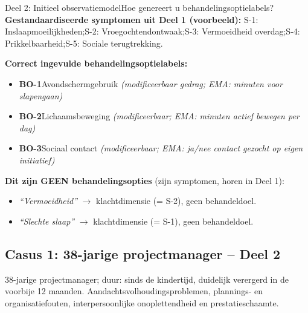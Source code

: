 \documentclass[11pt,a4paper]{article}
\begin{document}
\begin{voorbeeldbox}{Deel 2: Initieel observatiemodel}{Hoe genereert u behandelingsoptielabels?}
\small
\textbf{Gestandaardiseerde symptomen uit Deel 1 (voorbeeld):}
S-1: Inslaapmoeilijkheden;\enspace S-2: Vroegochtendontwaak;\enspace S-3: Vermoeidheid overdag;\enspace S-4: Prikkelbaarheid;\enspace S-5: Sociale terugtrekking.

\medskip
\textbf{Correct ingevulde behandelingsoptielabels:}
\begin{itemize}[topsep=2pt,itemsep=1pt]
\item \textbf{BO-1}\enspace Avondschermgebruik
  \hfill\textit{(modificeerbaar gedrag; EMA: minuten voor slapengaan)}
\item \textbf{BO-2}\enspace Lichaamsbeweging
  \hfill\textit{(modificeerbaar; EMA: minuten actief bewegen per dag)}
\item \textbf{BO-3}\enspace Sociaal contact
  \hfill\textit{(modificeerbaar; EMA: ja/nee contact gezocht op eigen initiatief)}
\end{itemize}

\medskip
\textbf{\color{StrongRed}Dit zijn GEEN behandelingsopties} (zijn symptomen, horen in Deel 1):
\begin{itemize}[topsep=1pt,itemsep=0pt]
\item \textit{``Vermoeidheid''} $\rightarrow$ klachtdimensie (= S-2), geen behandeldoel.
\item \textit{``Slechte slaap''} $\rightarrow$ klachtdimensie (= S-1), geen behandeldoel.
\end{itemize}
\end{voorbeeldbox}

\vspace{0.5em}

\newpage
\subsection*{Casus 1: 38-jarige projectmanager -- Deel 2}

\begin{complaintbox}[title={Casus 1: verkorte klachtomschrijving}]
\small 38-jarige projectmanager; duur: sinds de kindertijd, duidelijk verergerd in de voorbije 12 maanden. Aandachtsvolhoudingsproblemen, plannings- en organisatiefouten, interpersoonlijke onoplettendheid en prestatieschaamte.
\end{complaintbox}
\end{document}
